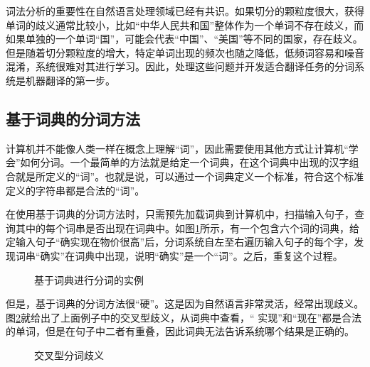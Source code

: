 \vspace{0.8em}

\parinterval 词法分析的重要性在自然语言处理领域已经有共识。如果切分的颗粒度很大，获得单词的歧义通常比较小，比如“中华人民共和国”整体作为一个单词不存在歧义，而如果单独的一个单词“国”，可能会代表“中国”、“美国”等不同的国家，存在歧义。但是随着切分颗粒度的增大，特定单词出现的频次也随之降低，低频词容易和噪音混淆，系统很难对其进行学习。因此，处理这些问题并开发适合翻译任务的分词系统是机器翻译的第一步。


\subsection{基于词典的分词方法}

\parinterval 计算机并不能像人类一样在概念上理解“词”，因此需要使用其他方式让计算机“学会”如何分词。一个最简单的方法就是给定一个词典，在这个词典中出现的汉字组合就是所定义的“词”。也就是说，可以通过一个词典定义一个标准，符合这个标准定义的字符串都是合法的“词”。

\parinterval 在使用基于词典的分词方法时，只需预先加载词典到计算机中，扫描输入句子，查询其中的每个词串是否出现在词典中。如图\ref{fig:3.2-2}所示，有一个包含六个词的词典，给定输入句子“确实现在物价很高”后，分词系统自左至右遍历输入句子的每个字，发现词串“确实”在词典中出现，说明“确实”是一个“词”。之后，重复这个过程。

\begin{figure}[htp]
\centering

\caption{基于词典进行分词的实例}
\label{fig:3.2-2}
\end{figure}

\parinterval 但是，基于词典的分词方法很“硬”。这是因为自然语言非常灵活，经常出现歧义。图\ref{fig:3.2-3}就给出了上面例子中的交叉型歧义，从词典中查看，“ 实现”和“现在”都是合法的单词，但是在句子中二者有重叠，因此词典无法告诉系统哪个结果是正确的。

\begin{figure}[htp]
\centering

\caption{交叉型分词歧义}
\label{fig:3.2-3}
\end{figure}

